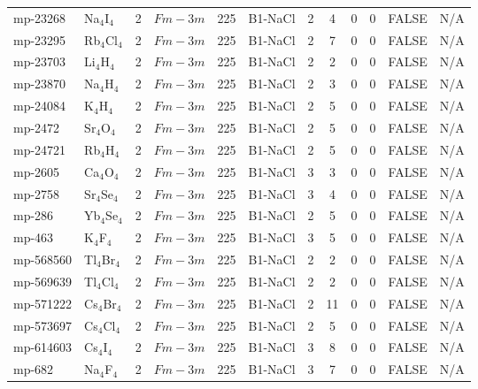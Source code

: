 {\begin{longtable}{llcccccccccc}
    mp-23268 & Na$_{4}$I$_{4}$ & 2     & $Fm-3m$ & 225   & B1-NaCl & 2     & 4     & 0     & 0     & FALSE & N/A \\
    mp-23295 & Rb$_{4}$Cl$_{4}$ & 2     & $Fm-3m$ & 225   & B1-NaCl & 2     & 7     & 0     & 0     & FALSE & N/A \\
    mp-23703 & Li$_{4}$H$_{4}$ & 2     & $Fm-3m$ & 225   & B1-NaCl & 2     & 2     & 0     & 0     & FALSE & N/A \\
    mp-23870 & Na$_{4}$H$_{4}$ & 2     & $Fm-3m$ & 225   & B1-NaCl & 2     & 3     & 0     & 0     & FALSE & N/A \\
    mp-24084 & K$_{4}$H$_{4}$ & 2     & $Fm-3m$ & 225   & B1-NaCl & 2     & 5     & 0     & 0     & FALSE & N/A \\
    mp-2472 & Sr$_{4}$O$_{4}$ & 2     & $Fm-3m$ & 225   & B1-NaCl & 2     & 5     & 0     & 0     & FALSE & N/A \\
    mp-24721 & Rb$_{4}$H$_{4}$ & 2     & $Fm-3m$ & 225   & B1-NaCl & 2     & 5     & 0     & 0     & FALSE & N/A \\
    mp-2605 & Ca$_{4}$O$_{4}$ & 2     & $Fm-3m$ & 225   & B1-NaCl & 3     & 3     & 0     & 0     & FALSE & N/A \\
    mp-2758 & Sr$_{4}$Se$_{4}$ & 2     & $Fm-3m$ & 225   & B1-NaCl & 3     & 4     & 0     & 0     & FALSE & N/A \\
    mp-286 & Yb$_{4}$Se$_{4}$ & 2     & $Fm-3m$ & 225   & B1-NaCl & 2     & 5     & 0     & 0     & FALSE & N/A \\
    mp-463 & K$_{4}$F$_{4}$ & 2     & $Fm-3m$ & 225   & B1-NaCl & 3     & 5     & 0     & 0     & FALSE & N/A \\
    mp-568560 & Tl$_{4}$Br$_{4}$ & 2     & $Fm-3m$ & 225   & B1-NaCl & 2     & 2     & 0     & 0     & FALSE & N/A \\
    mp-569639 & Tl$_{4}$Cl$_{4}$ & 2     & $Fm-3m$ & 225   & B1-NaCl & 2     & 2     & 0     & 0     & FALSE & N/A \\
    mp-571222 & Cs$_{4}$Br$_{4}$ & 2     & $Fm-3m$ & 225   & B1-NaCl & 2     & 11    & 0     & 0     & FALSE & N/A \\
    mp-573697 & Cs$_{4}$Cl$_{4}$ & 2     & $Fm-3m$ & 225   & B1-NaCl & 2     & 5     & 0     & 0     & FALSE & N/A \\
    mp-614603 & Cs$_{4}$I$_{4}$ & 2     & $Fm-3m$ & 225   & B1-NaCl & 3     & 8     & 0     & 0     & FALSE & N/A \\
    mp-682 & Na$_{4}$F$_{4}$ & 2     & $Fm-3m$ & 225   & B1-NaCl & 3     & 7     & 0     & 0     & FALSE & N/A \\

\end{longtable}}
